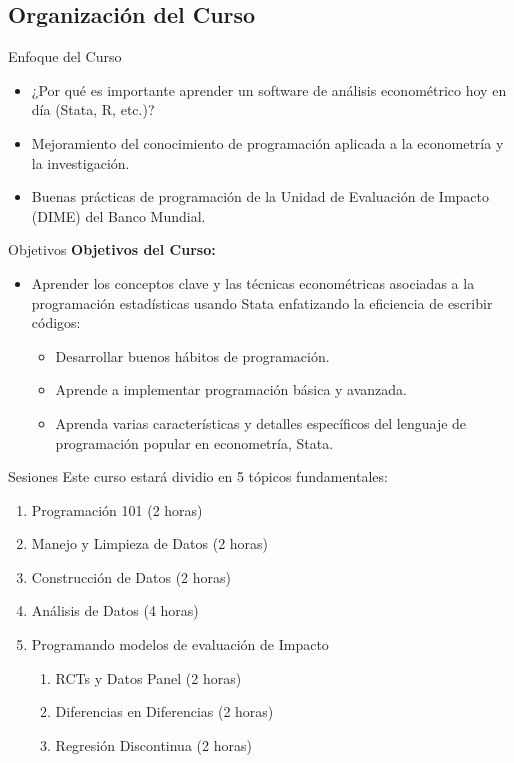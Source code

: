\documentclass[11pt, aspectratio=169, compress]{beamer}
\begin{document}
\subsection{Organización del Curso}
\begin{frame}{Enfoque del Curso}
	\begin{itemize}
		\item ¿Por qué es importante aprender un software de análisis econométrico hoy en día (Stata, R, etc.)? 
		\item Mejoramiento del conocimiento de programación aplicada a la econometría y la investigación.
		\item Buenas prácticas de programación de la Unidad de Evaluación de Impacto (DIME) del Banco Mundial.
	\end{itemize}
\end{frame}
\begin{frame}{Objetivos}
	\textbf{Objetivos del Curso:} 
	\begin{itemize}
		\item Aprender los conceptos clave y las técnicas econométricas asociadas a la programación estadísticas usando Stata enfatizando la eficiencia de escribir códigos: 
		\begin{itemize}
			\item Desarrollar buenos hábitos de programación.
			\item Aprende a implementar programación básica y avanzada.
			\item Aprenda varias características y detalles específicos del lenguaje de programación popular en econometría, Stata.
		\end{itemize}

	\end{itemize}
\end{frame}
\begin{frame}{Sesiones}
	Este curso estará dividio en 5 tópicos fundamentales: 
	\begin{enumerate}
		\item Programación 101 (2 horas)
		\item Manejo y Limpieza de Datos (2 horas)
		\item Construcción de Datos (2 horas)
		\item Análisis de Datos (4 horas)
		\item Programando modelos de evaluación de Impacto
		\begin{enumerate}
			\item RCTs y Datos Panel (2 horas)
			\item Diferencias en Diferencias (2 horas)
			\item Regresión Discontinua (2 horas)
		\end{enumerate}
	\end{enumerate}	
\end{frame}
\end{document}

